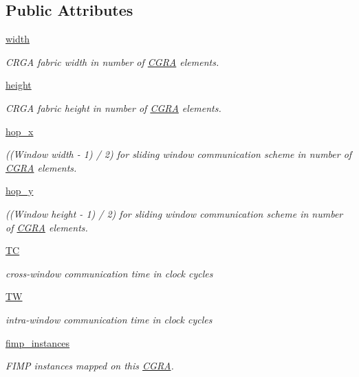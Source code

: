 \subsection*{Public Attributes}
\begin{DoxyCompactItemize}
\item 
\hyperlink{classsylva_1_1base_1_1cgra_1_1_c_g_r_a_a303858bc048fcc89e1b223bc6b9082bd}{width}
\begin{DoxyCompactList}\small\item\em C\+R\+GA fabric width in number of \hyperlink{classsylva_1_1base_1_1cgra_1_1_c_g_r_a}{C\+G\+RA} elements. \end{DoxyCompactList}\item 
\hyperlink{classsylva_1_1base_1_1cgra_1_1_c_g_r_a_ab60b2034fe9b4e7ec4495734e7e539ff}{height}
\begin{DoxyCompactList}\small\item\em C\+R\+GA fabric height in number of \hyperlink{classsylva_1_1base_1_1cgra_1_1_c_g_r_a}{C\+G\+RA} elements. \end{DoxyCompactList}\item 
\hyperlink{classsylva_1_1base_1_1cgra_1_1_c_g_r_a_ae67d495bb4c25fad719b784050791deb}{hop\+\_\+x}
\begin{DoxyCompactList}\small\item\em ((Window width -\/ 1) / 2) for sliding window communication scheme in number of \hyperlink{classsylva_1_1base_1_1cgra_1_1_c_g_r_a}{C\+G\+RA} elements. \end{DoxyCompactList}\item 
\hyperlink{classsylva_1_1base_1_1cgra_1_1_c_g_r_a_acefbfbffe5662d0ffe67edc5e8ab2dc5}{hop\+\_\+y}
\begin{DoxyCompactList}\small\item\em ((Window height -\/ 1) / 2) for sliding window communication scheme in number of \hyperlink{classsylva_1_1base_1_1cgra_1_1_c_g_r_a}{C\+G\+RA} elements. \end{DoxyCompactList}\item 
\hyperlink{classsylva_1_1base_1_1cgra_1_1_c_g_r_a_aaf504ff22d9654086c2aa987e382f49e}{TC}
\begin{DoxyCompactList}\small\item\em cross-\/window communication time in clock cycles \end{DoxyCompactList}\item 
\hyperlink{classsylva_1_1base_1_1cgra_1_1_c_g_r_a_a0bab5c20e9d084928b52b87d875f838b}{TW}
\begin{DoxyCompactList}\small\item\em intra-\/window communication time in clock cycles \end{DoxyCompactList}\item 
\hyperlink{classsylva_1_1base_1_1cgra_1_1_c_g_r_a_a9c917482a404c44bfe983498adaefe2b}{fimp\+\_\+instances}
\begin{DoxyCompactList}\small\item\em F\+I\+MP instances mapped on this \hyperlink{classsylva_1_1base_1_1cgra_1_1_c_g_r_a}{C\+G\+RA}. \end{DoxyCompactList}\end{DoxyCompactItemize}

